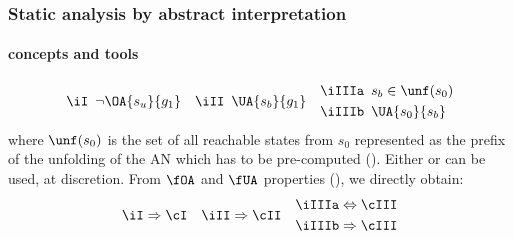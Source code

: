 \begin{frame}[c]
 \frametitle{Static analysis by abstract interpretation}
\framesubtitle{concepts and tools}
 
\begin{align*}
\text{\iI}\enspace&\neg \OA{s_u}{g_1}&
\text{\iII}\enspace&\UA{s_b}{g_1}&
\begin{split}
\text{\iIIIa}\enspace&s_b\in\unf(s_0)\\
\text{\iIIIb}\enspace&\UA{s_0}{s_b}
\end{split}
\end{align*}
where $\unf(s_0)$ is the set of all reachable states from $s_0$ represented as the prefix of the
unfolding of the AN which has to be pre-computed ().
Either \iIIIa or \iIIIb can be used, at discretion.
From $\fOA$ and $\fUA$ properties (), we directly obtain:
\begin{align*}
\text{\iI}&\Rightarrow\text{\cI}&
\text{\iII}&\Rightarrow\text{\cII}&
\begin{split}
\text{\iIIIa}&\Leftrightarrow\text{\cIII}\\
\text{\iIIIb}&\Rightarrow\text{\cIII}
\end{split}
\end{align*}

\end{frame}
